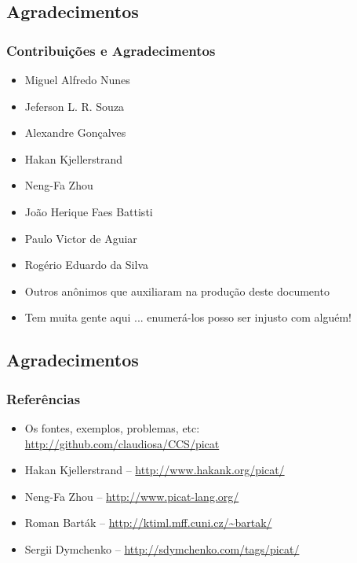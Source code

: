 \subsection{Agradecimentos}

\begin{frame}[fragile]
  \frametitle{Contribuições e Agradecimentos}

  \begin{itemize}
  \item Miguel Alfredo Nunes
  \item Jeferson L. R. Souza
    \item Alexandre Gonçalves 
    \item Hakan Kjellerstrand
    \item Neng-Fa Zhou
    \item João Herique Faes Battisti
    \item Paulo Victor de Aguiar
    \item Rogério Eduardo da Silva
    \item Outros anônimos que auxiliaram na produção deste documento
    \item Tem muita gente aqui ... enumerá-los posso ser injusto com alguém!
  \end{itemize}

\end{frame}

\subsection{Agradecimentos}

\begin{frame}[fragile]
  \frametitle{Referências}

  \begin{itemize}
    \item Os fontes, exemplos, problemas, etc:\\ 
    \url{http://github.com/claudiosa/CCS/picat}
    \item Hakan Kjellerstrand -- \url{http://www.hakank.org/picat/}
    \item Neng-Fa Zhou -- \url{http://www.picat-lang.org/}
    \item Roman Barták -- \url{http://ktiml.mff.cuni.cz/~bartak/}
    \item Sergii Dymchenko -- \url{http://sdymchenko.com/tags/picat/}
  \end{itemize}

\end{frame}




